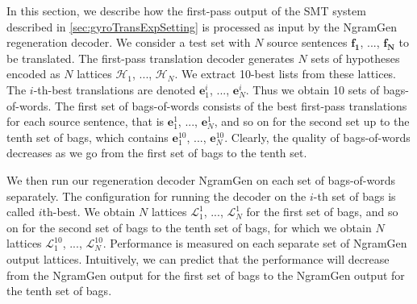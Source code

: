 In this section, we describe how the first-pass output
of the SMT system described in \autoref{sec:gyroTransExpSetting}
is processed as input by the NgramGen regeneration decoder.
We consider a test set with $N$ source sentences
$\bm{f_1}$, ..., $\bm{f_N}$ to be translated.
The first-pass translation decoder generates $N$ sets of hypotheses %
encoded as $N$ lattices $\mathcal{H}_1$, ..., $\mathcal{H}_N$.
We extract 10-best lists from these lattices.
The $i$-th-best translations are denoted $\bm{e}_1^i$, ..., $\bm{e}_N^i$.
Thus we obtain
10 sets of bags-of-words. The first set of bags-of-words consists
of the best first-pass translations for each source sentence, that is
$\bm{e}_1^1$, ..., $\bm{e}_N^1$, and so on
for the second set up to the tenth set of bags, which contains
$\bm{e}_1^{10}$, ..., $\bm{e}_N^{10}$. Clearly, the quality of
bags-of-words decreases as we go from the first set of bags to the
tenth set.

We then run our regeneration decoder
NgramGen on each
set of bags-of-words separately. The configuration for running
the decoder on the $i$-th set of bags is called $i$th-best.
We obtain
$N$ lattices $\mathcal{L}_1^1$, ..., $\mathcal{L}_N^1$ for the first set of bags,
and so on for the second set of bags to the tenth set of bags, for which we
obtain $N$ lattices $\mathcal{L}_1^{10}$, ..., $\mathcal{L}_N^{10}$.
Performance is measured
on each separate set of NgramGen output lattices.
Intuitively, we can predict that the performance will decrease from
the NgramGen output for the first set of bags to the NgramGen output for
the tenth set of bags.

